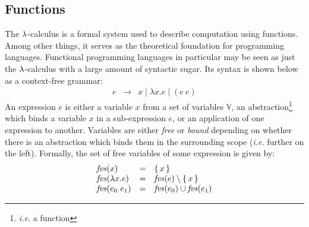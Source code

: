 \documentclass[10pt,a4paper]{exam}
\begin{document}
\begin{questions}
\section*{Functions}

\question The $\color{black}\lambda$-calculus is a formal system used to describe computation using functions. Among other things, it serves as the theoretical foundation for programming languages. Functional programming languages in particular may be seen as just the $\color{black}\lambda$-calculus with a large amount of syntactic sugar. Its syntax is shown below as a context-free grammar:
\begin{displaymath}
\begin{array}{lcl}
e & \to & x \mid \lambda x.e \mid (e~e)
\end{array}
\end{displaymath} 
An expression $e$ is either a variable $x$ from a set of variables $\mathbb{V}$, an abstraction\footnote{\emph{i.e.} a function} which binds a variable $x$ in a sub-expression $e$, or an application of one expression to another. Variables are either \emph{free} or \emph{bound} depending on whether there is an abstraction which binds them in the surrounding scope (\emph{i.e.} further on the left). Formally, the set of free variables of some expression is given by: 
\begin{displaymath}
\begin{array}{lcl}
\mathit{fvs}(x) & = & \{\,x\,\} \\
\mathit{fvs}(\lambda x.e) & = & \mathit{fvs}(e) \setminus \{\,x\,\} \\
\mathit{fvs}(e_0~e_1) & = & \mathit{fvs}(e_0) \cup \mathit{fvs}(e_1)
\end{array}
\end{displaymath}
\end{questions}
\end{document}
